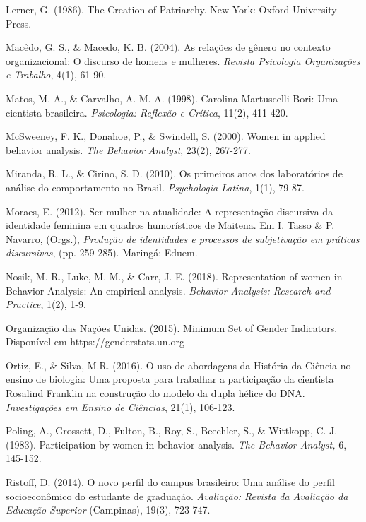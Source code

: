 \hangindent=25pt
\noindent Lerner, G. (1986). The Creation of Patriarchy. New York: Oxford University Press.

\hangindent=25pt
\noindent Macêdo, G. S., \& Macedo, K. B. (2004). As relações de gênero no contexto organizacional: O discurso de homens e mulheres. \textit{Revista Psicologia Organizações e Trabalho}, 4(1), 61-90. 

\hangindent=25pt
\noindent Matos, M. A., \& Carvalho, A. M. A. (1998). Carolina Martuscelli Bori: Uma cientista brasileira. \textit{Psicologia: Reflexão e Crítica}, 11(2), 411-420. 
 
\hangindent=25pt
\noindent McSweeney, F. K., Donahoe, P., \& Swindell, S. (2000). Women in applied behavior analysis. \textit{The Behavior Analyst}, 23(2), 267-277.

\hangindent=25pt
\noindent Miranda, R. L., \& Cirino, S. D. (2010). Os primeiros anos dos laboratórios de análise do comportamento no Brasil. \textit{Psychologia Latina}, 1(1), 79-87.

\hangindent=25pt
\noindent Moraes, E. (2012). Ser mulher na atualidade: A representação discursiva da identidade feminina em quadros humorísticos de Maitena. Em I. Tasso \& P. Navarro, (Orgs.), \textit{Produção de identidades e processos de subjetivação em práticas discursivas}, (pp. 259-285). Maringá: Eduem.

\hangindent=25pt
\noindent Nosik, M. R., Luke, M. M., \& Carr, J. E. (2018). Representation of women in Behavior Analysis: An empirical analysis. \textit{Behavior Analysis: Research and Practice}, 1(2), 1-9.

\hangindent=25pt
\noindent Organização das Nações Unidas. (2015). Minimum Set of Gender Indicators. Disponível em https://genderstats.un.org

\hangindent=25pt
\noindent Ortiz, E., \& Silva, M.R. (2016). O uso de abordagens da História da Ciência no ensino de biologia: Uma proposta para trabalhar a participação da cientista Rosalind Franklin na construção do modelo da dupla hélice do DNA. \textit{Investigações em Ensino de Ciências}, 21(1), 106-123. 

\hangindent=25pt
\noindent Poling, A., Grossett, D., Fulton, B., Roy, S., Beechler, S., \& Wittkopp, C. J. (1983). Participation by women in behavior analysis.\textit{ The Behavior Analyst,} 6, 145-152.

\hangindent=25pt
\noindent Ristoff, D. (2014). O novo perfil do campus brasileiro: Uma análise do perfil socioeconômico do estudante de graduação. \textit{Avaliação: Revista da Avaliação da Educação Superior} (Campinas), 19(3), 723-747.

